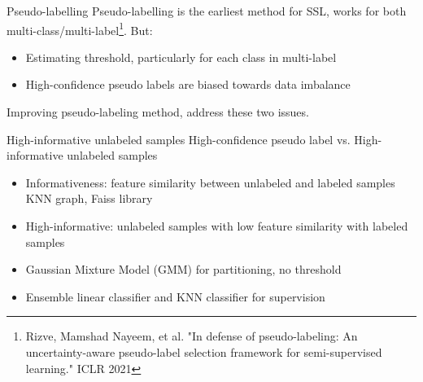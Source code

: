 \documentclass[handout]{beamer}
\begin{document}
\begin{frame}{Pseudo-labelling}
    Pseudo-labelling is the earliest method for SSL, works for both multi-class/multi-label\footnote[7]{\tiny Rizve, Mamshad Nayeem, et al. "In defense of pseudo-labeling: An uncertainty-aware pseudo-label selection framework for semi-supervised learning." ICLR 2021}. But:
    \begin{itemize}
        \item Estimating threshold, particularly for each class in multi-label
        \item High-confidence pseudo labels are biased towards data imbalance
    \end{itemize}
    Improving pseudo-labeling method, address these two issues.
\end{frame}

\begin{frame}{High-informative unlabeled samples}
    High-confidence pseudo label vs. High-informative unlabeled samples
    \begin{itemize}
        \item Informativeness: feature similarity between unlabeled and labeled samples \\
        KNN graph, Faiss library
        \item High-informative: unlabeled samples with low feature similarity with labeled samples
        \item Gaussian Mixture Model (GMM) for partitioning, no threshold
        \item Ensemble linear classifier and KNN classifier for supervision
    \end{itemize}
\end{frame}
\end{document}
